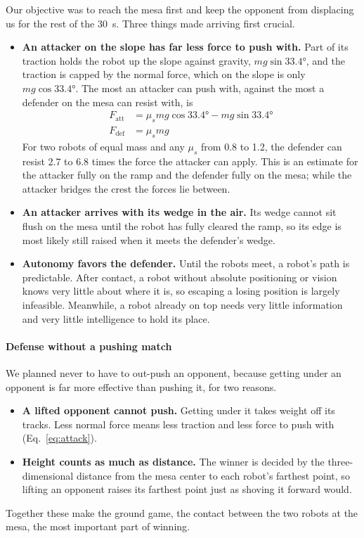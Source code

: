 Our objective was to reach the mesa first and keep the opponent from displacing us for the rest of the \qty{30}{s}. Three things made arriving first crucial.
\begin{itemize}
  \item \textbf{An attacker on the slope has far less force to push with.} Part of its traction holds the robot up the slope against gravity, $m g \sin\ang{33.4}$, and the traction is capped by the normal force, which on the slope is only $m g \cos\ang{33.4}$. The most an attacker can push with, against the most a defender on the mesa can resist with, is
  \begin{align}
    F_\mathrm{att} &= \mu_s m g \cos\ang{33.4} - m g \sin\ang{33.4} \label{eq:attack} \\
    F_\mathrm{def} &= \mu_s m g \label{eq:defend}
  \end{align}
  For two robots of equal mass and any $\mu_s$ from 0.8 to 1.2, the defender can resist 2.7 to 6.8 times the force the attacker can apply. This is an estimate for the attacker fully on the ramp and the defender fully on the mesa; while the attacker bridges the crest the forces lie between.
  \item \textbf{An attacker arrives with its wedge in the air.} Its wedge cannot sit flush on the mesa until the robot has fully cleared the ramp, so its edge is most likely still raised when it meets the defender's wedge.
  \item \textbf{Autonomy favors the defender.} Until the robots meet, a robot's path is predictable. After contact, a robot without absolute positioning or vision knows very little about where it is, so escaping a losing position is largely infeasible. Meanwhile, a robot already on top needs very little information and very little intelligence to hold its place.
\end{itemize}

\paragraph{Defense without a pushing match}
We planned never to have to out-push an opponent, because getting under an opponent is far more effective than pushing it, for two reasons.
\begin{itemize}
  \item \textbf{A lifted opponent cannot push.} Getting under it takes weight off its tracks. Less normal force means less traction and less force to push with (Eq.~\eqref{eq:attack}).
  \item \textbf{Height counts as much as distance.} The winner is decided by the three-dimensional distance from the mesa center to each robot's farthest point, so lifting an opponent raises its farthest point just as shoving it forward would.
\end{itemize}
Together these make the ground game, the contact between the two robots at the mesa, the most important part of winning.

